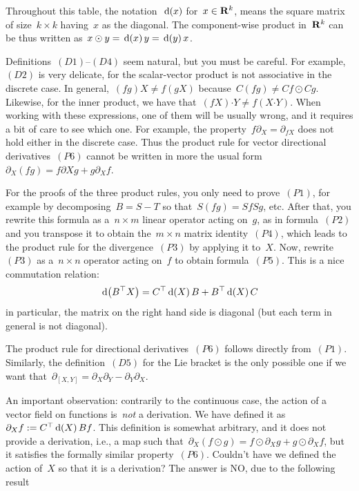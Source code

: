 Throughout this table, the notation~$\,\mathrm{d}\!\left(x\right)$ for~$x\in\mathbf{R}^k$, means the
square matrix of size~$k\times k$ having~$x$ as the diagonal.  The
component-wise product in~$\mathbf{R}^k$ can be thus written as~$x\odot
y=\,\mathrm{d}\!\left(x\right)y=\,\mathrm{d}\!\left(y\right)x$.

Definitions~$(D1)$--$(D4)$ seem natural, but you must be careful.
For example,~$(D2)$ is very delicate, for the scalar-vector product is not
associative in the discrete case.  In general,~$(fg)X\neq f(gX)$
because~$C(fg)\neq Cf\odot Cg$.
Likewise, for the inner product, we have
that~$\left(fX\right)\boldsymbol{\cdot}Y\neq f\left(X\boldsymbol{\cdot}
Y\right)$.  When working with these expressions, one of them will be usually
wrong, and it requires a bit of care to see which one.
For example, the
property~$f\partial_X=\partial_{fX}$ does not hold either in
the discrete case.  Thus the product rule for vector directional derivatives~$(P6)$ cannot be
written in more the usual form~$\partial_X(fg)=f\partial Xg+g\partial_Xf$.

For the proofs of the three
product rules, you only need to prove~$(P1)$, for
example by decomposing~$B=S-T$ so that~$S(fg)=SfSg$, etc.
After that, you rewrite this formula as
a~$n\times m$ linear operator acting on~$g$, as in formula~$(P2)$ and you
transpose it to obtain the~$m\times n$ matrix identity~$(P4)$, which leads to
the product rule for the divergence~$(P3)$ by applying it to~$X$.  Now,
rewrite~$(P3)$ as a~$n\times n$ operator acting on~$f$ to obtain
formula~$(P5)$.   This is a nice commutation relation:
\[
	\,\mathrm{d}\!\left(B^\top X\right)=C^\top\,\mathrm{d}\!\left(X\right)B+B^\top\,\mathrm{d}\!\left(X\right)C
\]
in particular, the matrix on the right hand side is diagonal (but each term
in general is not diagonal).

The product rule for directional derivatives~$(P6)$ follows directly
from~$(P1)$.  Similarly, the definition~$(D5)$ for the Lie bracket is the
only possible one if we want
that~$\partial_{[X,Y]}=\partial_X\partial_Y-\partial_Y\partial_X$.

An important observation: contrarily to the continuous case, the action of
a vector field on functions is~\emph{not} a derivation.  We have defined it
as~$\partial_Xf:=C^\top \,\mathrm{d}\!\left(X\right)Bf$.  This definition is somewhat arbitrary,
and it does not provide a derivation, i.e., a map such
that~$\partial_X\left(f\odot g\right)=f\odot\partial_Xg+g\odot\partial_Xf$,
but it satisfies the formally similar property~$(P6)$.  Couldn't have we
defined the action of~$X$ so that it is a derivation?  The answer is NO, due
to the following result

